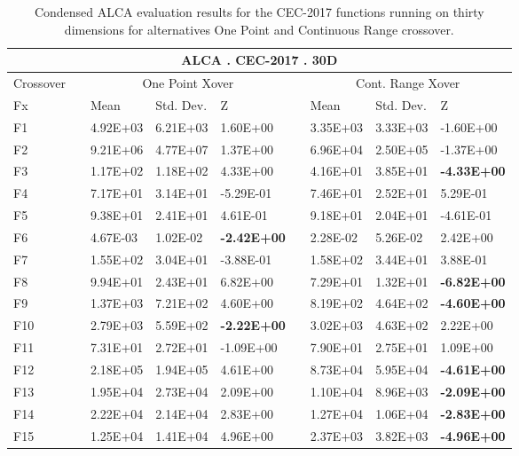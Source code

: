 \documentclass[graybox]{svmult}
\begin{document}
    \begin{table}[]
    \scriptsize
    \centering
    \caption{Condensed ALCA evaluation results for the CEC-2017 functions running on thirty dimensions for alternatives One Point and Continuous Range crossover.}\label{tab.condensed_evaluation_30D}    
    \begin{tabular}{@{}lllllllll@{}}
    \toprule
    \multicolumn{9}{c}{\textbf{ALCA . CEC-2017 . 30D}} \\ \midrule
    Crossover &  & \multicolumn{3}{c}{One Point Xover} &  & \multicolumn{3}{c}{Cont. Range Xover} \\
    Fx &  & Mean & Std. Dev. & Z &  & Mean & Std. Dev. & Z \\
    F1 &  & 4.92E+03 & 6.21E+03 & 1.60E+00 &  & 3.35E+03 & 3.33E+03 & -1.60E+00 \\
    F2 &  & 9.21E+06 & 4.77E+07 & 1.37E+00 &  & 6.96E+04 & 2.50E+05 & -1.37E+00 \\
    F3 &  & 1.17E+02 & 1.18E+02 & 4.33E+00 &  & 4.16E+01 & 3.85E+01 & \textbf{-4.33E+00} \\
    F4 &  & 7.17E+01 & 3.14E+01 & -5.29E-01 &  & 7.46E+01 & 2.52E+01 & 5.29E-01 \\
    F5 &  & 9.38E+01 & 2.41E+01 & 4.61E-01 &  & 9.18E+01 & 2.04E+01 & -4.61E-01 \\
    F6 &  & 4.67E-03 & 1.02E-02 & \textbf{-2.42E+00} &  & 2.28E-02 & 5.26E-02 & 2.42E+00 \\
    F7 &  & 1.55E+02 & 3.04E+01 & -3.88E-01 &  & 1.58E+02 & 3.44E+01 & 3.88E-01 \\
    F8 &  & 9.94E+01 & 2.43E+01 & 6.82E+00 &  & 7.29E+01 & 1.32E+01 & \textbf{-6.82E+00} \\
    F9 &  & 1.37E+03 & 7.21E+02 & 4.60E+00 &  & 8.19E+02 & 4.64E+02 & \textbf{-4.60E+00} \\
    F10 &  & 2.79E+03 & 5.59E+02 & \textbf{-2.22E+00} &  & 3.02E+03 & 4.63E+02 & 2.22E+00 \\
    F11 &  & 7.31E+01 & 2.72E+01 & -1.09E+00 &  & 7.90E+01 & 2.75E+01 & 1.09E+00 \\
    F12 &  & 2.18E+05 & 1.94E+05 & 4.61E+00 &  & 8.73E+04 & 5.95E+04 & \textbf{-4.61E+00} \\
    F13 &  & 1.95E+04 & 2.73E+04 & 2.09E+00 &  & 1.10E+04 & 8.96E+03 & \textbf{-2.09E+00} \\
    F14 &  & 2.22E+04 & 2.14E+04 & 2.83E+00 &  & 1.27E+04 & 1.06E+04 & \textbf{-2.83E+00} \\
    F15 &  & 1.25E+04 & 1.41E+04 & 4.96E+00 &  & 2.37E+03 & 3.82E+03 & \textbf{-4.96E+00} \\

\end{tabular}
\end{table}
\end{document}
